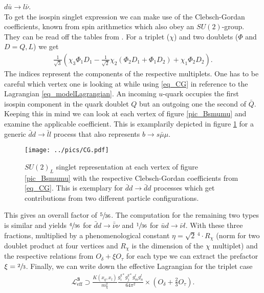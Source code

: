 $d \bar u\rightarrow l\bar\nu$. \\
\noindent To get the isospin singlet expression we can make use of the Clebsch-Gordan coefficients, known from spin arithmetics which also obey an $SU(2)$-group.
They can be read off the tables from \cite{PDG}. For a triplet ($\chi$) and two doublets ($\Phi$ and $D=Q,L$) we get
\begin{align}
 \frac{1}{\sqrt{3}}\left(\chi_3\Phi_1D_1 - \frac{1}{\sqrt{2}}\chi_2\left(\Phi_2D_1+\Phi_1 D_2\right) + \chi_1\Phi_2D_2 \right).
 \label{eq_CG}
\end{align}
The indices represent the components of the respective multiplets. One has to be careful which vertex one is looking at while using \eqref{eq_CG} in reference
to the Lagrangian \eqref{eq_modelLagrangian}. An incoming $u$-quark occupies the first isospin component in the quark doublet $Q$ but an outgoing one the 
second of $\bar Q$. Keeping this in mind we can look at each vertex of figure \ref{pic_Bsmumu} and examine the applicable coefficient. This is examplarily
depicted in figure \ref{pic_CG} for a generic $\bar d d\rightarrow \bar l l$ process that also represents $ b  \rightarrow s\bar \mu \mu$.
\begin{figure}[t]
 \texttt{[image: ../pics/CG.pdf]}
 \caption{$SU(2)_L$ singlet representation at each vertex of figure \ref{pic_Bsmumu} with the respective Clebsch-Gordan coefficients from \eqref{eq_CG}. 
 This is exemplary for $\bar d d\rightarrow \bar d d$ processes which get contributions from two different particle configurations.}
 \label{pic_CG}
\end{figure}
This gives an overall factor of $\sfrac{5}{36}$. The computation for the remaining two types is similar and yields $\sfrac{4}{36}$ for 
$\bar d d\rightarrow \bar \bar \nu \nu$ and $\sfrac{1}{36}$ for $\bar u d \rightarrow \bar \nu l$. With these three fractions, multiplied by a 
phenomenological constant $\eta=\sqrt{2}\,^4\cdot R_\chi$ (norm for two doublet product at four vertices and $R_\chi$ is the dimension of the $\chi$ multiplet) 
and the respective relations from $O_\delta + \xi O_\tau$ for each type 
we can extract the prefactor $\xi=\sfrac23$. Finally, we can write down the effective Lagrangian for the triplet case
\begin{align}
 \mathcal{L}^{\textbf{3}}_\text{eff} \supset \frac{K(x_q,x_l)}{m_\chi^2}\frac{g_i^{q*} g_j^{q*} g_m^l g_n^l}{64\pi^2}\times\left(O_\delta + \frac23 O_\tau\right).
 \label{eq_LagBSmumuModB}
\end{align}
